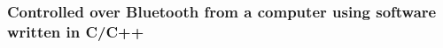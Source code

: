 \documentclass{article}
\begin{document}
		\subsubsection{Controlled over Bluetooth from a computer using software written in C/C++}
		
		
\end{document}

